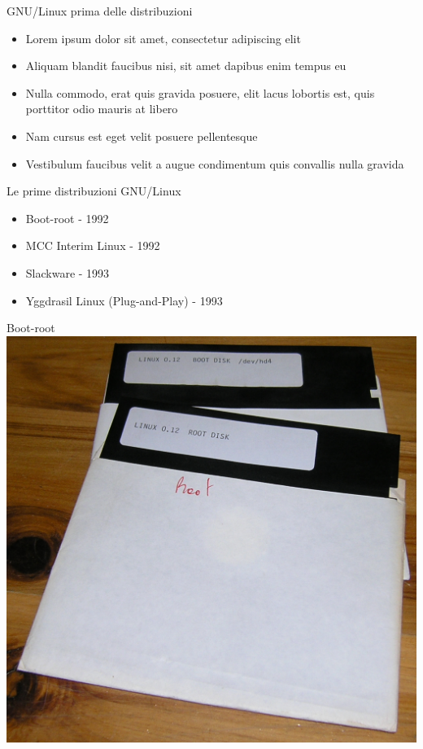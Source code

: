 \begin{frame}{GNU/Linux prima delle distribuzioni}
    \begin{itemize}
        \item Lorem ipsum dolor sit amet, consectetur adipiscing elit
        \item Aliquam blandit faucibus nisi, sit amet dapibus enim tempus eu
        \item Nulla commodo, erat quis gravida posuere, elit lacus lobortis est, quis porttitor odio mauris at libero
        \item Nam cursus est eget velit posuere pellentesque
        \item Vestibulum faucibus velit a augue condimentum quis convallis nulla gravida
    \end{itemize}
\end{frame}


\begin{frame}{Le prime distribuzioni GNU/Linux}
    \begin{itemize}
        \item Boot-root - 1992
        \item MCC Interim Linux - 1992
        \item Slackware - 1993
        \item Yggdrasil Linux (Plug-and-Play) - 1993
    \end{itemize}
\end{frame}

\begin{frame}{Boot-root}
    \centering
    \includegraphics[scale=0.14]{images/Linux_0_12.jpg}
\end{frame}

